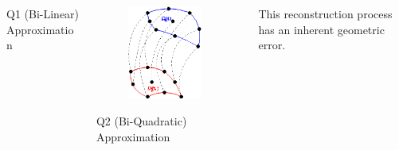 \documentclass[8pt,xcolor=svgnames]{beamer}
\begin{document}
\begin{frame}
\begin{columns}[T]
\begin{column}{0.65\textwidth}
\begin{columns}
\begin{column}{0.5\textwidth}
\begin{figure}[h!]
    \end{figure}
    \centering
    Q1 (Bi-Linear) Approximation
    \end{column}
    \begin{column}{0.5\textwidth}
    \begin{figure}[h!]
    \centering
    \includegraphics[width=0.9\textwidth,keepaspectratio=true]{./Images/motion2.png}
    \end{figure}
    \centering
    Q2 (Bi-Quadratic) Approximation
    \end{column}
    \end{columns}
  \end{column}
  \begin{column}{0.3\textwidth}
   This reconstruction process has an inherent geometric error.
   \begin{block}{}
    \begin{figure}[h!]
    \centering

\end{figure}
\end{block}
\end{column}
\end{columns}
\end{frame}
\end{document}
